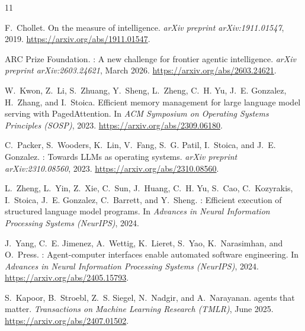 \documentclass[10pt]{article}
\begin{document}
\begin{thebibliography}{11}\small\setlength{\itemsep}{1pt}\setlength{\parskip}{1pt}

F.~Chollet.
\newblock On the measure of intelligence.
\newblock \emph{arXiv preprint arXiv:1911.01547}, 2019.
\newblock \url{https://arxiv.org/abs/1911.01547}.

{ARC Prize Foundation}.
: A new challenge for frontier agentic intelligence.
\newblock \emph{arXiv preprint arXiv:2603.24621}, March 2026.
\newblock \url{https://arxiv.org/abs/2603.24621}.

W.~Kwon, Z.~Li, S.~Zhuang, Y.~Sheng, L.~Zheng, C.~H. Yu, J.~E. Gonzalez, H.~Zhang, and I.~Stoica.
\newblock Efficient memory management for large language model serving with {PagedAttention}.
\newblock In \emph{ACM Symposium on Operating Systems Principles (SOSP)}, 2023.
\newblock \url{https://arxiv.org/abs/2309.06180}.

C.~Packer, S.~Wooders, K.~Lin, V.~Fang, S.~G. Patil, I.~Stoica, and J.~E. Gonzalez.
: Towards {LLM}s as operating systems.
\newblock \emph{arXiv preprint arXiv:2310.08560}, 2023.
\newblock \url{https://arxiv.org/abs/2310.08560}.

L.~Zheng, L.~Yin, Z.~Xie, C.~Sun, J.~Huang, C.~H. Yu, S.~Cao, C.~Kozyrakis, I.~Stoica, J.~E. Gonzalez, C.~Barrett, and Y.~Sheng.
: Efficient execution of structured language model programs.
\newblock In \emph{Advances in Neural Information Processing Systems (NeurIPS)}, 2024.

J.~Yang, C.~E. Jimenez, A.~Wettig, K.~Lieret, S.~Yao, K.~Narasimhan, and O.~Press.
: Agent-computer interfaces enable automated software engineering.
\newblock In \emph{Advances in Neural Information Processing Systems (NeurIPS)}, 2024.
\newblock \url{https://arxiv.org/abs/2405.15793}.

S.~Kapoor, B.~Stroebl, Z.~S. Siegel, N.~Nadgir, and A.~Narayanan.
 agents that matter.
\newblock \emph{Transactions on Machine Learning Research (TMLR)}, June 2025.
\newblock \url{https://arxiv.org/abs/2407.01502}.


\end{thebibliography}
\end{document}
